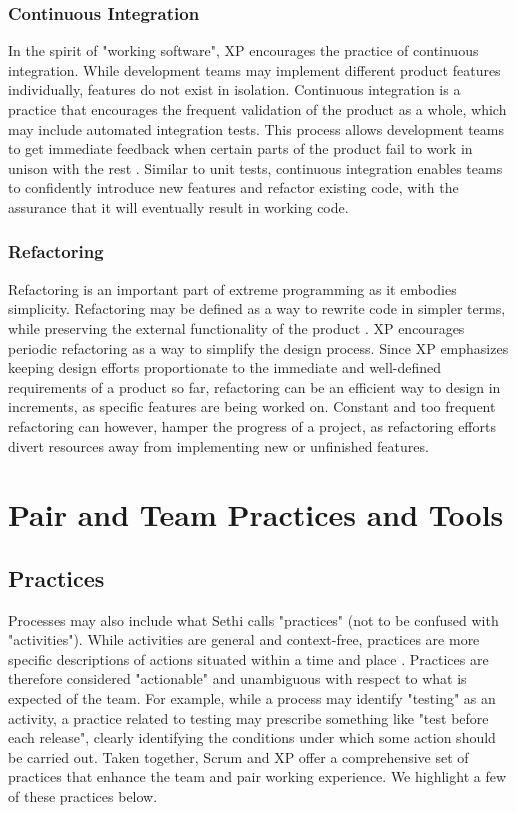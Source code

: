 \documentclass[11pt]{article}
\begin{document}
        \subsubsection{Continuous Integration}
        In the spirit of "working software", XP encourages the practice of continuous integration. While development teams may implement different product features individually, features do not exist in isolation. Continuous integration is a practice that encourages the frequent validation of the product as a whole, which may include automated integration tests. This process allows development teams to get immediate feedback when certain parts of the product fail to work in unison with the rest \citet{sethi}. Similar to unit tests, continuous integration enables teams to confidently introduce new features and refactor existing code, with the assurance that it will eventually result in working code.

        \subsubsection{Refactoring}
        Refactoring is an important part of extreme programming as it embodies simplicity. Refactoring may be defined as a way to rewrite code in simpler terms, while preserving the external functionality of the product \citet{sethi}. XP encourages periodic refactoring as a way to simplify the design process. Since XP emphasizes keeping design efforts proportionate to the immediate and well-defined requirements of a product so far, refactoring can be an efficient way to design in increments, as specific features are being worked on. Constant and too frequent refactoring can however, hamper the progress of a project, as refactoring efforts divert resources away from implementing new or unfinished features.
        

\section{Pair and Team Practices and Tools}
    \subsection{Practices}
        Processes may also include what Sethi calls "practices" (not to be confused with "activities"). While activities are general and context-free, practices are more specific descriptions of actions situated within a time and place \citet{sethi}. Practices are therefore considered "actionable" and unambiguous with respect to what is expected of the team. For example, while a process may identify "testing" as an activity, a practice related to testing may prescribe something like "test before each release", clearly identifying the conditions under which some action should be carried out. Taken together, Scrum and XP offer a comprehensive set of practices that enhance the team and pair working experience. We highlight a few of these practices below.
        
\end{document}
